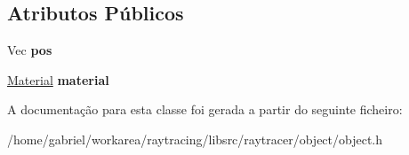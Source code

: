 \subsection*{Atributos Públicos}
\begin{DoxyCompactItemize}
\item 
\mbox{\label{classObject_a029376a01e31536d24013a5d65580184}} 
Vec {\bfseries pos}
\item 
\mbox{\label{classObject_a2f63d05a9a9264e1b6c388fa4bba4e91}} 
\hyperlink{classMaterial}{Material} {\bfseries material}
\end{DoxyCompactItemize}


A documentação para esta classe foi gerada a partir do seguinte ficheiro\+:\begin{DoxyCompactItemize}
\item 
/home/gabriel/workarea/raytracing/libsrc/raytracer/object/object.\+h\end{DoxyCompactItemize}
